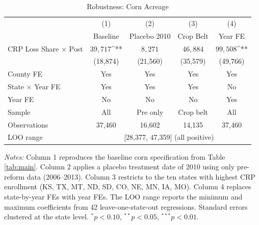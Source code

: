 \begin{table}[t]
\centering
\caption{Robustness: Corn Acreage}
\label{tab:robustness}
\begin{tabular}{lcccc}
\hline\hline
 & (1) & (2) & (3) & (4) \\
 & Baseline & Placebo 2010 & Crop Belt & Year FE \\
\hline
CRP Loss Share $\times$ Post & $39,717$^{**} & $8,271$ & $46,884$ & $99,508$^{**} \\
 & (18,874) & (21,560) & (35,579) & (49,766) \\
\hline
County FE & Yes & Yes & Yes & Yes \\
State $\times$ Year FE & Yes & Yes & Yes & No \\
Year FE & No & No & No & Yes \\
Sample & All & Pre only & Crop belt & All \\
Observations & 37,460 & 16,602 & 14,135 & 37,460 \\
LOO range & \multicolumn{4}{c}{[28,377, 47,359] (all positive)} \\
\hline\hline
\end{tabular}
\begin{tablenotes}[flushleft]\small
\item \textit{Notes:} Column 1 reproduces the baseline corn specification from Table \ref{tab:main}. Column 2 applies a placebo treatment date of 2010 using only pre-reform data (2006--2013). Column 3 restricts to the ten states with highest CRP enrollment (KS, TX, MT, ND, SD, CO, NE, MN, IA, MO). Column 4 replaces state-by-year FEs with year FEs. The LOO range reports the minimum and maximum coefficients from 42 leave-one-state-out regressions. Standard errors clustered at the state level. $^{*}p<0.10$, $^{**}p<0.05$, $^{***}p<0.01$.
\end{tablenotes}
\end{table}

